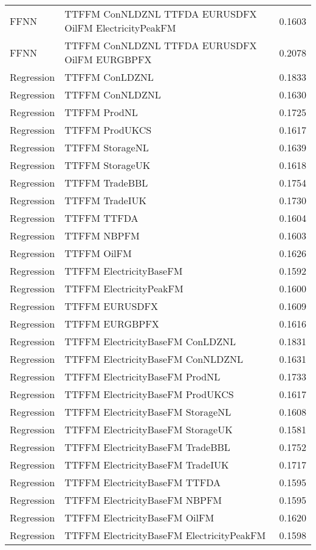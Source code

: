 \begin{table}[h!]
\begin{adjustbox}{max width=\textwidth}
\begin{tabular}{llr}
  FFNN & TTFFM ConNLDZNL TTFDA EURUSDFX OilFM ElectricityPeakFM & 0.1603 \\ 
  FFNN & TTFFM ConNLDZNL TTFDA EURUSDFX OilFM EURGBPFX & 0.2078 \\ 
  Regression & TTFFM ConLDZNL & 0.1833 \\ 
  Regression & TTFFM ConNLDZNL & 0.1630 \\ 
  Regression & TTFFM ProdNL & 0.1725 \\ 
  Regression & TTFFM ProdUKCS & 0.1617 \\ 
  Regression & TTFFM StorageNL & 0.1639 \\ 
  Regression & TTFFM StorageUK & 0.1618 \\ 
  Regression & TTFFM TradeBBL & 0.1754 \\ 
  Regression & TTFFM TradeIUK & 0.1730 \\ 
  Regression & TTFFM TTFDA & 0.1604 \\ 
  Regression & TTFFM NBPFM & 0.1603 \\ 
  Regression & TTFFM OilFM & 0.1626 \\ 
  Regression & TTFFM ElectricityBaseFM & 0.1592 \\ 
  Regression & TTFFM ElectricityPeakFM & 0.1600 \\ 
  Regression & TTFFM EURUSDFX & 0.1609 \\ 
  Regression & TTFFM EURGBPFX & 0.1616 \\ 
  Regression & TTFFM ElectricityBaseFM ConLDZNL & 0.1831 \\ 
  Regression & TTFFM ElectricityBaseFM ConNLDZNL & 0.1631 \\ 
  Regression & TTFFM ElectricityBaseFM ProdNL & 0.1733 \\ 
  Regression & TTFFM ElectricityBaseFM ProdUKCS & 0.1617 \\ 
  Regression & TTFFM ElectricityBaseFM StorageNL & 0.1608 \\ 
  Regression & TTFFM ElectricityBaseFM StorageUK & 0.1581 \\ 
  Regression & TTFFM ElectricityBaseFM TradeBBL & 0.1752 \\ 
  Regression & TTFFM ElectricityBaseFM TradeIUK & 0.1717 \\ 
  Regression & TTFFM ElectricityBaseFM TTFDA & 0.1595 \\ 
  Regression & TTFFM ElectricityBaseFM NBPFM & 0.1595 \\ 
  Regression & TTFFM ElectricityBaseFM OilFM & 0.1620 \\ 
  Regression & TTFFM ElectricityBaseFM ElectricityPeakFM & 0.1598 \\ 

\end{tabular}
\end{adjustbox}
\end{table}
